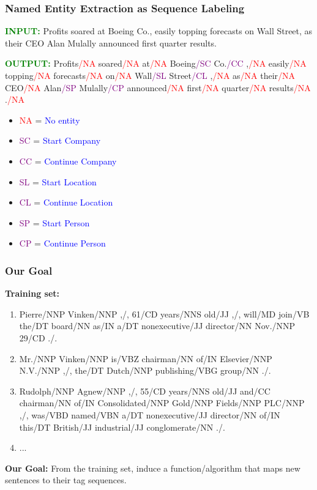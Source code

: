 \documentclass[handout]{beamer}
\begin{document}
\begin{frame}
  \frametitle{Named Entity Extraction as Sequence Labeling}
  \scriptsize
   \textcolor{green}{\textbf{INPUT:}}
  Profits soared at Boeing Co., easily topping forecasts on Wall Street, as their CEO Alan Mulally announced first quarter results. \vspace{0.5cm}

  \textcolor{green}{\textbf{OUTPUT:}}
  Profits\textcolor{red}{/NA} soared\textcolor{red}{/NA} at\textcolor{red}{/NA} Boeing\textcolor{purple}{/SC} Co.\textcolor{purple}{/CC} ,\textcolor{red}{/NA} easily\textcolor{red}{/NA} topping\textcolor{red}{/NA} forecasts\textcolor{red}{/NA} on\textcolor{red}{/NA} Wall\textcolor{purple}{/SL} Street\textcolor{purple}{/CL} ,\textcolor{red}{/NA} as\textcolor{red}{/NA} their\textcolor{red}{/NA} CEO\textcolor{red}{/NA} Alan\textcolor{purple}{/SP} Mulally\textcolor{purple}{/CP} announced\textcolor{red}{/NA} first\textcolor{red}{/NA} quarter\textcolor{red}{/NA} results\textcolor{red}{/NA} .\textcolor{red}{/NA} \vspace{0.5cm}

  \begin{itemize}
    \item \textcolor{red}{NA} = \textcolor{blue}{No entity}
    \item \textcolor{purple}{SC} = \textcolor{blue}{Start Company}
    \item \textcolor{purple}{CC} = \textcolor{blue}{Continue Company}
    \item \textcolor{purple}{SL} = \textcolor{blue}{Start Location}
    \item \textcolor{purple}{CL} = \textcolor{blue}{Continue Location}
    \item \textcolor{purple}{SP} = \textcolor{blue}{Start Person}
    \item \textcolor{purple}{CP} = \textcolor{blue}{Continue Person}
  \end{itemize}
\end{frame}


\begin{frame}
  \frametitle{Our Goal}
  \textbf{Training set:}
  \begin{enumerate}
    \item Pierre/NNP Vinken/NNP ,/, 61/CD years/NNS old/JJ ,/, will/MD join/VB the/DT board/NN as/IN a/DT nonexecutive/JJ director/NN Nov./NNP 29/CD ./.
    \item Mr./NNP Vinken/NNP is/VBZ chairman/NN of/IN Elsevier/NNP N.V./NNP ,/, the/DT Dutch/NNP publishing/VBG group/NN ./.
    \item Rudolph/NNP Agnew/NNP ,/, 55/CD years/NNS old/JJ and/CC chairman/NN of/IN Consolidated/NNP Gold/NNP Fields/NNP PLC/NNP ,/, was/VBD named/VBN a/DT nonexecutive/JJ director/NN of/IN this/DT British/JJ industrial/JJ conglomerate/NN ./.
    \item ...
  \end{enumerate}

  \textbf{Our Goal:} From the training set, induce a function/algorithm that maps new sentences to their tag sequences.
\end{frame}
\end{document}
